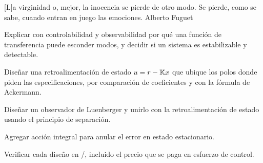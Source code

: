 
  {[L]a virginidad o, mejor, la inocencia se pierde de otro modo. Se pierde, como se sabe, cuando entran en juego las emociones.}
  {Alberto Fuguet}

\begin{objetivos}
  \item Explicar con controlabilidad y observabilidad por qué una función de transferencia puede esconder modos, y decidir si un sistema es estabilizable y detectable.
  \item Diseñar una retroalimentación de estado $u=r-\mathbb{K} x$ que ubique los polos donde piden las especificaciones, por comparación de coeficientes y con la fórmula de Ackermann.
  \item Diseñar un observador de Luenberger y unirlo con la retroalimentación de estado usando el principio de separación.
  \item Agregar acción integral para anular el error en estado estacionario.
  \item Verificar cada diseño en \matlab/\simulink, incluido el precio que se paga en esfuerzo de control.
\end{objetivos}










